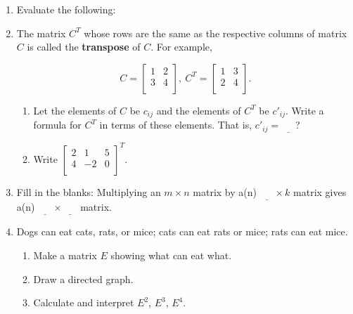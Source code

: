 \documentclass[../textbook.tex]{subfiles}
\begin{document}
\begin{enumerate}
\setcounter{enumi}{\value{problem_i}}
\item Evaluate the following:
\begin{enumerate}
\end{enumerate}

\item The matrix $C^T$ whose rows are the same as the respective columns of matrix $C$ is called the \textbf{transpose} of $C$. For example,

$$C=\left[\begin{array}{cc}
1 & 2 \\
3 & 4 \\
\end{array}\right],\: C^T=\left[\begin{array}{cc}
1 & 3 \\
2 & 4 \\
\end{array}\right].$$

\begin{enumerate}
\item Let the elements of $C$ be $c_{ij}$ and the elements of $C^T$ be $c'_{ij}$. Write a formula for $C^T$ in terms of these elements. That is, $c'_{ij} = \underline{\phantom{egg}}$?
\item Write $\left[\begin{array}{ccc}
2 & 1 & 5 \\
4 & -2 & 0 \\
\end{array}\right]^T$.
\end{enumerate}
\item Fill in the blanks: Multiplying an $m\times n$ matrix by a(n) $\underline{\phantom{egg}} \times k$ matrix gives a(n) $\underline{\phantom{egg}}\times\underline{\phantom{egg}}$ matrix.
\item Dogs can eat cats, rats, or mice; cats can eat rats or mice; rats can eat mice.
\begin{enumerate}
\item Make a matrix $E$ showing what can eat what.
\item Draw a directed graph.
\item Calculate and interpret $E^2$, $E^3$, $E^4$.
\end{enumerate}
\setcounter{problem_i}{\value{enumi}}
\end{enumerate}
\end{document}

